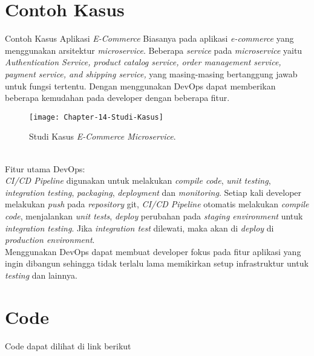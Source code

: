 \section{Contoh Kasus}
Contoh Kasus Aplikasi \textit{E-Commerce}
Biasanya pada aplikasi \textit{e-commerce} yang menggunakan arsitektur \textit{microservice}. Beberapa \textit{service} pada \textit{microservice} yaitu
\textit{Authentication Service, product catalog service, order management service, payment service, and shipping service,} yang masing-masing bertanggung jawab untuk fungsi tertentu.
Dengan menggunakan DevOps dapat memberikan beberapa kemudahan pada developer dengan beberapa fitur.
\begin{figure}[h]
	\centering
	\texttt{[image: Chapter-14-Studi-Kasus]}
	\caption{Studi Kasus \textit{E-Commerce Microservice}.}
	\label{fig:client-server-schema}
\end{figure}
\\Fitur utama DevOps:
	\\\textit{CI/CD Pipeline} digunakan untuk melakukan \textit{compile code}, \textit{unit testing}, \textit{integration testing}, \textit{packaging}, \textit{deployment} dan \textit{monitoring}.
	Setiap kali developer melakukan \textit{push} pada \textit{repository} git, \textit{CI/CD Pipeline} otomatis melakukan \textit{compile code}, menjalankan \textit{unit tests},
	\textit{deploy} perubahan pada \textit{staging environment} untuk \textit{integration testing}. Jika \textit{integration test} dilewati, maka akan di \textit{deploy} di \textit{production environment}.
	\\Menggunakan DevOps dapat membuat developer fokus pada fitur aplikasi yang ingin dibangun sehingga tidak terlalu lama memikirkan setup infrastruktur untuk \textit{testing} dan lainnya.
\section{Code}
Code dapat dilihat di link berikut
